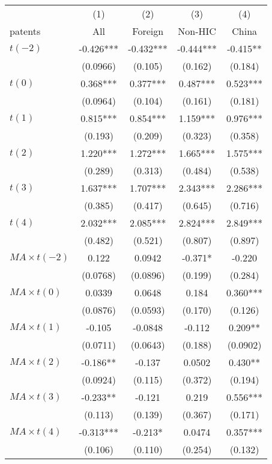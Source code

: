 \documentclass{beamer} %
\begin{document}
\begin{frame}[plain, label=dynamic]
	\begin{table}[p!]
		\centering
		{ \tiny
		\begin{tabular}{lcccc}
			\midrule
			& (1)   & (2)   & (3)   & (4) \\
			patents & All   & Foreign & Non-HIC & China \\
			\midrule
			$t(-2)$ & -0.426*** & -0.432*** & -0.444*** & -0.415** \\
			& (0.0966) & (0.105) & (0.162) & (0.184) \\
			$t(0)$  & 0.368*** & 0.377*** & 0.487*** & 0.523*** \\
			& (0.0964) & (0.104) & (0.161) & (0.181) \\
			$t(1)$  & 0.815*** & 0.854*** & 1.159*** & 0.976*** \\
			& (0.193) & (0.209) & (0.323) & (0.358) \\
			$t(2)$  & 1.220*** & 1.272*** & 1.665*** & 1.575*** \\
			& (0.289) & (0.313) & (0.484) & (0.538) \\
			$t(3)$  & 1.637*** & 1.707*** & 2.343*** & 2.286*** \\
			& (0.385) & (0.417) & (0.645) & (0.716) \\
			$t(4)$ & 2.032*** & 2.085*** & 2.824*** & 2.849*** \\
			& (0.482) & (0.521) & (0.807) & (0.897) \\
			\midrule
			$MA\times t(-2)$ & 0.122 & 0.0942 & -0.371* & -0.220 \\
			& (0.0768) & (0.0896) & (0.199) & (0.284) \\
			$MA\times t(0)$ & 0.0339 & 0.0648 & 0.184 & 0.360*** \\
			& (0.0876) & (0.0593) & (0.170) & (0.126) \\
			$MA\times t(1)$ & -0.105 & -0.0848 & -0.112 & 0.209** \\
			& (0.0711) & (0.0643) & (0.188) & (0.0902) \\
			$MA\times t(2)$ & -0.186** & -0.137 & 0.0502 & 0.430** \\
			& (0.0924) & (0.115) & (0.372) & (0.194) \\
			$MA\times t(3)$ & -0.233** & -0.121 & 0.219 & 0.556*** \\
			& (0.113) & (0.139) & (0.367) & (0.171) \\
			$MA\times t(4)$ & -0.313*** & -0.213* & 0.0474 & 0.357*** \\
			& (0.106) & (0.110) & (0.254) & (0.132) \\

\end{tabular}}
\end{table}
\end{frame}
\end{document}
